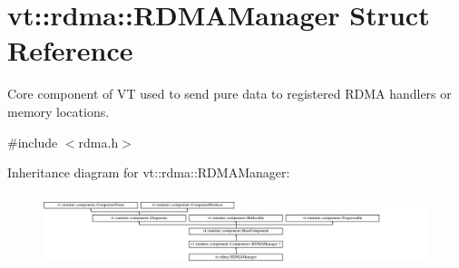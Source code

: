 \hypertarget{structvt_1_1rdma_1_1_r_d_m_a_manager}{}\section{vt\+:\+:rdma\+:\+:R\+D\+M\+A\+Manager Struct Reference}
\label{structvt_1_1rdma_1_1_r_d_m_a_manager}


Core component of VT used to send pure data to registered R\+D\+MA handlers or memory locations.  




{\ttfamily \#include $<$rdma.\+h$>$}

Inheritance diagram for vt\+:\+:rdma\+:\+:R\+D\+M\+A\+Manager\+:\begin{figure}[H]
\begin{center}
\leavevmode
\includegraphics[height=2.153846cm]{structvt_1_1rdma_1_1_r_d_m_a_manager}
\end{center}
\end{figure}
